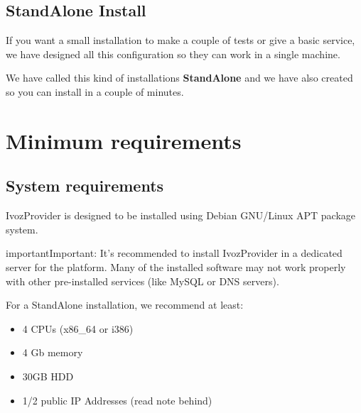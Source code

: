 \documentclass[letterpaper,10pt,english]{sphinxmanual}
\begin{document}
\subsection{StandAlone Install}
\label{basic_concepts/installation/install_types:instalacion-standalone}\label{basic_concepts/installation/install_types:id2}\label{basic_concepts/installation/install_types:standalone-install}
If you want a small installation to make a couple of tests or give a basic
service, we have designed all this configuration so they can work in a single
machine.

We have called this kind of installations \textbf{StandAlone} and we have also
created {\hyperref[basic_concepts/installation/cd_install:automatic\string-iso\string-cd\string-image]{}} so you can install in a couple of minutes.
\label{basic_concepts/installation/requirements:minimum-requirements}

\section{Minimum requirements}
\label{basic_concepts/installation/requirements:requisitos-minimos}\label{basic_concepts/installation/requirements:id1}\label{basic_concepts/installation/requirements::doc}\label{basic_concepts/installation/requirements:minimum-requirements}

\subsection{System requirements}
\label{basic_concepts/installation/requirements:system-requirements}
IvozProvider is designed to be installed using Debian GNU/Linux APT package
system.

\begin{notice}{important}{Important:}
It's recommended to install IvozProvider in a dedicated server
for the platform. Many of the installed software may not work properly with
other pre-installed services (like MySQL or DNS servers).
\end{notice}

For a StandAlone installation, we recommend at least:
\begin{itemize}
\item {} 
4 CPUs (x86\_64 or i386)

\item {} 
4 Gb memory

\item {} 
30GB HDD

\item {} 
1/2 public IP Addresses (read note behind)

\end{itemize}
\end{document}
